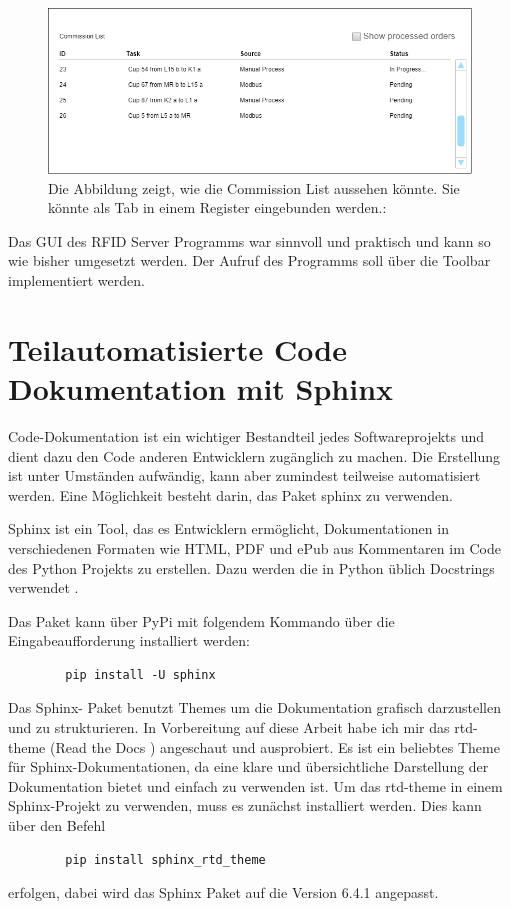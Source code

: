 \begin{figure}
        \caption[Mockup der Commission List]
        {\small Die Abbildung zeigt, wie die Commission List aussehen könnte. Sie könnte als Tab in einem Register eingebunden werden.:
        }\label{fig:figure13}
        \includegraphics[width = \textwidth ]{Bilder/Mockup_CommissionList}
        \centering
\end{figure}
\vspace{1cm}

Das GUI des RFID Server Programms war sinnvoll und praktisch und kann so wie bisher umgesetzt werden.
Der Aufruf des Programms soll über die Toolbar implementiert werden.

\newpage
\section{Teilautomatisierte Code Dokumentation mit Sphinx}

Code-Dokumentation ist ein wichtiger Bestandteil jedes Softwareprojekts und dient dazu den Code anderen Entwicklern zugänglich zu machen.
Die Erstellung ist unter Umständen aufwändig, kann aber zumindest teilweise automatisiert werden.
Eine Möglichkeit besteht darin, das Paket sphinx zu verwenden.

Sphinx ist ein Tool, das es Entwicklern ermöglicht, Dokumentationen in verschiedenen Formaten wie HTML, PDF und ePub
aus Kommentaren im Code des Python Projekts zu erstellen.
Dazu werden die in Python üblich Docstrings verwendet \cite{pepDocstrings}.

Das Paket kann über PyPi mit folgendem Kommando über die Eingabeaufforderung installiert werden:
\begin{lstlisting}
        pip install -U sphinx
\end{lstlisting}


Das Sphinx- Paket benutzt Themes um die Dokumentation grafisch darzustellen und zu strukturieren.
In Vorbereitung auf diese Arbeit habe ich mir das rtd-theme (Read the Docs \cite{RTD}) angeschaut und ausprobiert.
Es ist ein beliebtes Theme für Sphinx-Dokumentationen, da eine klare und übersichtliche Darstellung der Dokumentation
bietet und einfach zu verwenden ist.
Um das rtd-theme in einem Sphinx-Projekt zu verwenden, muss es zunächst installiert werden.
Dies kann über den Befehl
\begin{lstlisting}
        pip install sphinx_rtd_theme
\end{lstlisting}
erfolgen, dabei wird das Sphinx Paket auf die Version 6.4.1 angepasst.

